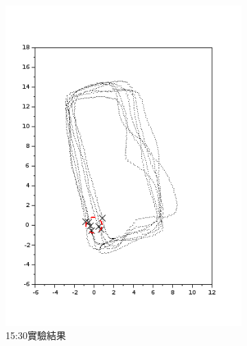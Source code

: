 \begin{figure}[h!]
\begin{subfigure}[t]{0.32\textwidth}
		\includegraphics[width=\textwidth]{figures/appendix1/dynamic_2}
		\caption{15:30實驗結果}
		\label{f:app:dynamic_2}
	\end{subfigure}
	\begin{subfigure}[t]{0.32\textwidth}

\end{subfigure}
\end{figure}
